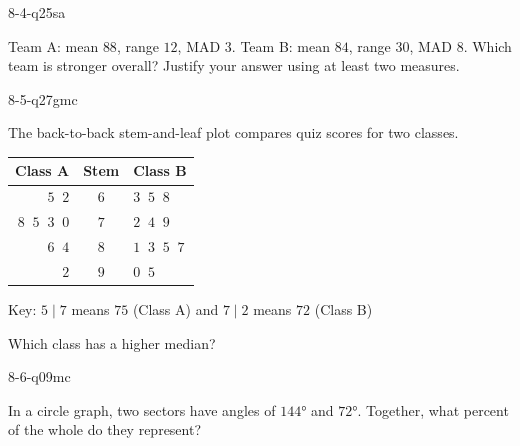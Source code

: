 \begin{practiceQuestion}{8-4-q25}{sa}
\begin{questionText}
Team A: mean $88$, range $12$, MAD $3$. Team B: mean $84$, range $30$, MAD $8$. Which team is stronger overall? Justify your answer using at least two measures.
\end{questionText}
\end{practiceQuestion}

\begin{practiceQuestion}{8-5-q27}{gmc}
\begin{questionText}
The back-to-back stem-and-leaf plot compares quiz scores for two classes.

\begin{center}
\begin{tabular}{r|c|l}
\textbf{Class A} & \textbf{Stem} & \textbf{Class B} \\
\hline
$5\;\;2$ & $6$ & $3\;\;5\;\;8$ \\
$8\;\;5\;\;3\;\;0$ & $7$ & $2\;\;4\;\;9$ \\
$6\;\;4$ & $8$ & $1\;\;3\;\;5\;\;7$ \\
$2$ & $9$ & $0\;\;5$
\end{tabular}

Key: $5 \mid 7$ means $75$ (Class A) and $7 \mid 2$ means $72$ (Class B)
\end{center}

Which class has a higher median?
\end{questionText}
\end{practiceQuestion}

\begin{practiceQuestion}{8-6-q09}{mc}
\begin{questionText}
In a circle graph, two sectors have angles of $144°$ and $72°$. Together, what percent of the whole do they represent?
\end{questionText}
\end{practiceQuestion}


